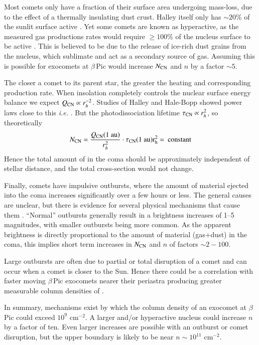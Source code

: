 \documentclass{aa}
\newcommand{\bp}{$\beta$\,Pic}
\begin{document}
Most comets only have a fraction of their surface area undergoing mass-loss, due to the effect of a thermally insulating dust crust.
%
Halley itself only has $\sim20$\% of the sunlit surface active \citep{Keller1987}.
%
Yet some comets are known as hyperactive, as the measured gas productions rates would require $\geq 100$\% of the nucleus surface to be active \citep{Sunshine2021}.
%
This is believed to be due to the release of ice-rich dust grains from the nucleus, which sublimate and act as a secondary source of gas.
%
Assuming this is possible for exocomets at \bp{} would increase $N_{\ce{CN}}$ and $n$ by a factor $\sim 5$.

The closer a comet to its parent star, the greater the heating and corresponding production rate.
%
When insolation completely controls the nuclear surface energy balance we expect
$Q_{\ce{CN}}\propto r_h^{-2}$.
%
Studies of Halley and Hale-Bopp showed power laws close to this {\it i.e.} \cite{Biver2002}.
%
But the photodissociation lifetime $\tau_{\ce{CN}}\propto r_h^{2}$, so theoretically
$$N_{\ce{CN}}=\frac{Q_{\ce{CN}}(1~\rm{au})}{r_h^2}\cdot  \tau_{\ce{CN}} (1~\rm{au}) r_h^2 =\:{\rm constant} $$
Hence the total amount of  in the coma should be approximately independent of stellar distance, and the total cross-section would not change.

Finally, comets have impulsive outbursts, where the amount of material ejected into the coma increases significantly over a few hours or less.
%
The general causes are unclear, but there is evidence for several physical mechanisms that cause them \citep{Kelley2021,Muller2024}.
%
``Normal'' outbursts generally result in a brightness increases of 1--5 magnitudes, with smaller outbursts being more common.
%
As the apparent brightness is directly proportional to the amount of material (gas+dust) in the coma, this implies short term increases in $N_{\ce{CN}}$ and $n$ of factors $\sim 2-100$.

Large outbursts are often due to partial or total disruption of a comet and can occur when a comet is closer to the Sun.
%
Hence there could be a correlation with faster moving \bp{} exocomets nearer their periastra producing greater measurable column densities of .

In summary, mechanisms exist by which the  column density of an exocomet at \bp{} could exceed $10^{9}$ cm$^{-2}$.
%
A larger and/or hyperactive nucleus could increase $n$ by a factor of ten.
%
Even larger increases are possible with an outburst or comet disruption, but the upper boundary is likely to be near $n\sim10^{11}$ cm$^{-2}$.
\end{document}
